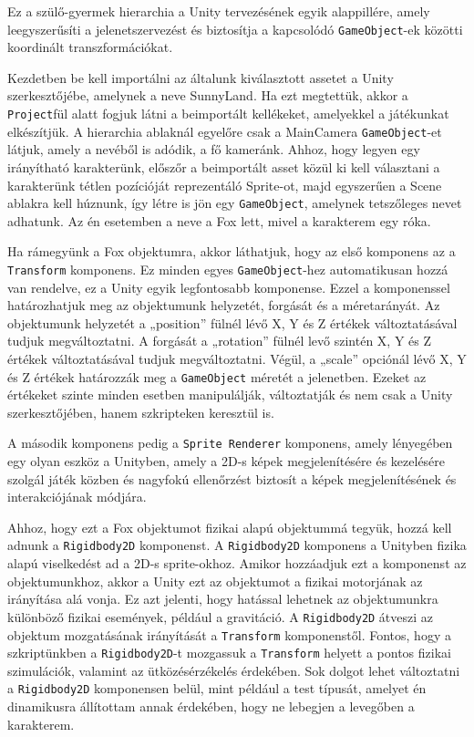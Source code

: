 Ez a szülő-gyermek hierarchia a Unity tervezésének egyik alappillére, amely leegyszerűsíti a jelenetszervezést és biztosítja a kapcsolódó \texttt{GameObject}-ek közötti koordinált transzformációkat.


Kezdetben be kell importálni az általunk kiválasztott assetet \cite{unityasset1} a Unity szerkesztőjébe, amelynek a neve SunnyLand. Ha ezt megtettük, akkor a \texttt{Project}fül alatt fogjuk látni a beimportált kellékeket, amelyekkel a játékunkat elkészítjük. A hierarchia ablaknál egyelőre csak a MainCamera \texttt{GameObject}-et látjuk, amely a nevéből is adódik, a fő kameránk. Ahhoz, hogy legyen egy irányítható karakterünk, előszőr a beimportált asset közül ki kell választani a karakterünk tétlen pozícióját reprezentáló Sprite-ot, majd egyszerűen a Scene ablakra kell húznunk, így létre is jön egy \texttt{GameObject}, amelynek tetszőleges nevet adhatunk. Az én esetemben a neve a Fox lett, mivel a karakterem egy róka.

Ha rámegyünk a Fox objektumra, akkor láthatjuk, hogy az első komponens az a \texttt{Transform} komponens. Ez minden egyes \texttt{GameObject}-hez automatikusan hozzá van rendelve, ez a Unity egyik legfontosabb komponense. Ezzel a komponenssel határozhatjuk meg az objektumunk helyzetét, forgását és a méretarányát. 
Az objektumunk helyzetét a „position” fülnél lévő X, Y és Z értékek változtatásával tudjuk megváltoztatni. A forgását a „rotation” fülnél levő szintén X, Y és Z értékek változtatásával tudjuk megváltoztatni. Végül, a „scale” opciónál lévő X, Y és Z értékek határozzák meg a \texttt{GameObject} méretét a jelenetben. 
Ezeket az értékeket szinte minden esetben manipulálják, változtatják és nem csak a Unity szerkesztőjében, hanem szkripteken keresztül is. \cite{transformcomponent}

A második komponens pedig a \texttt{Sprite Renderer} komponens, amely lényegében egy olyan eszköz a Unityben, amely a 2D-s képek megjelenítésére és kezelésére szolgál játék közben és nagyfokú ellenőrzést biztosít a képek megjelenítésének és interakciójának módjára. 

Ahhoz, hogy ezt a Fox objektumot fizikai alapú objektummá tegyük, hozzá kell adnunk a \texttt{Rigidbody2D} komponenst. A \texttt{Rigidbody2D} komponens a Unityben fizika alapú viselkedést ad a 2D-s sprite-okhoz. Amikor hozzáadjuk ezt a komponenst az objektumunkhoz, akkor a Unity ezt az objektumot a fizikai motorjának az irányítása alá vonja. Ez azt jelenti, hogy hatással lehetnek az objektumunkra különböző fizikai események, például a gravitáció. A \texttt{Rigidbody2D} átveszi az objektum mozgatásának irányítását a \texttt{Transform} komponenstől. Fontos, hogy a szkriptünkben a \texttt{Rigidbody2D}-t mozgassuk a \texttt{Transform} helyett a pontos fizikai szimulációk, valamint az ütközésérzékelés érdekében. Sok dolgot lehet változtatni a \texttt{Rigidbody2D} komponensen belül, mint például a test típusát, amelyet én dinamikusra állítottam annak érdekében, hogy ne lebegjen a levegőben a karakterem. \cite{unityrigidbody2d}

